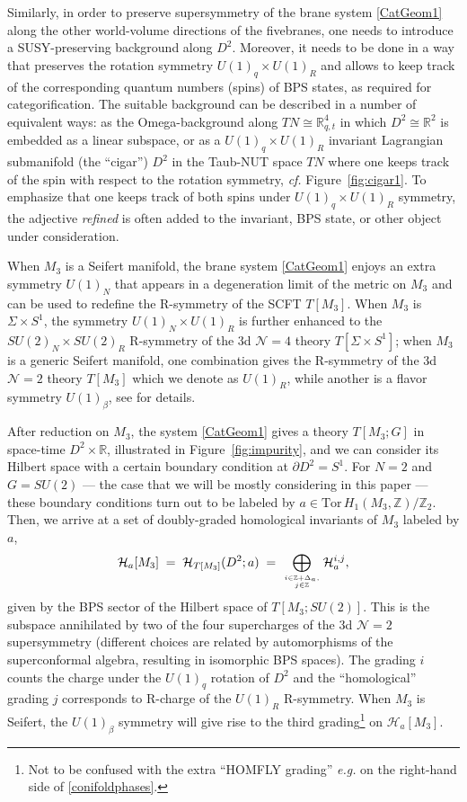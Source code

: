 \documentclass[hyper,letterpaper]{JHEP3}
\newcommand{\Z}{{\mathbb Z}}
\newcommand{\R}{{\mathbb R}}
\def\CH{{\mathcal H}}
\def\CN{{\mathcal N}}
\def\Tor{{\mathrm{Tor}\,}}
\begin{document}
Similarly, in order to preserve supersymmetry of the brane system \eqref{CatGeom1} along the other world-volume
directions of the fivebranes, one needs to introduce a SUSY-preserving background along $D^2$.
Moreover, it needs to be done in a way that preserves the rotation symmetry $U(1)_q\times U(1)_R$
and allows to keep track of the corresponding quantum numbers (spins) of BPS states, as required for categorification.
The suitable background can be described in a number of equivalent ways: as the Omega-background
along $TN \cong \R^4_{q,t}$ in which $D^2 \cong \R^2$ is embedded as a linear subspace,
or as a $U(1)_q\times U(1)_R$ invariant Lagrangian submanifold (the ``cigar'') $D^2$ in the Taub-NUT space $TN$
where one keeps track of the spin with respect to the rotation symmetry, {\it cf.} Figure~\ref{fig:cigar1}.
To emphasize that one keeps track of both spins under $U(1)_q\times U(1)_R$ symmetry,
the adjective {\it refined} is often added to the invariant, BPS state, or other object under consideration.

When $M_3$ is a Seifert manifold, the brane system \eqref{CatGeom1} enjoys an extra symmetry $U(1)_N$ that appears in a degeneration limit of the metric on $M_3$ and can be used to redefine the R-symmetry of the SCFT $T[M_3]$. When $M_3$ is $\Sigma \times S^1$, the symmetry $U(1)_N\times U(1)_R$ is further enhanced to the $SU(2)_N\times SU(2)_R$ R-symmetry of the 3d $\CN=4$ theory $T[\Sigma\times S^1]$; when $M_3$ is a generic Seifert manifold, one combination gives the R-symmetry of the 3d $\CN=2$ theory $T[M_3]$ which we denote as $U(1)_R$, while another is a flavor symmetry $U(1)_{\beta}$, see \cite[sec.~3.4]{Gukov:2016gkn} for details.

After reduction on $M_3$, the system \eqref{CatGeom1} gives a theory $T[M_3;G]$ in space-time $D^2\times \R$, illustrated in Figure~\ref{fig:impurity}, and we can consider its Hilbert space with a certain boundary condition at $\partial D^2=S^1$. For $N=2$ and $G=SU(2)$ --- the case that we will be mostly considering in this paper --- these boundary conditions turn out to be labeled by $a\in \Tor H_1(M_3,\Z)/\Z_2$. Then, we arrive at a set of doubly-graded homological invariants of $M_3$ labeled by $a$,
\begin{equation}
	\CH_a[M_3] \; = \; \CH_{T[M_3]}(D^2;a) \; = \; \bigoplus_{i\in \Z+\Delta_a,\atop j\in\Z}\CH^{i,j}_a,
\end{equation}
given by the BPS sector of the Hilbert space of $T[M_3;SU(2)]$. This is the subspace annihilated by two of the four supercharges of the 3d $\CN=2$ supersymmetry (different choices are related by automorphisms of the superconformal algebra, resulting in isomorphic BPS spaces). The grading $i$ counts the charge under the $U(1)_{q}$ rotation of $D^2$ and the ``homological'' grading $j$ corresponds to R-charge of the $U(1)_R$ R-symmetry. When $M_3$ is Seifert, the $U(1)_{\beta}$ symmetry will give rise to the third grading\footnote{Not to be confused with the extra ``HOMFLY grading'' {\it e.g.} on the right-hand side of \eqref{conifoldphases}.} on $\CH_a[M_3]$.
\end{document}
